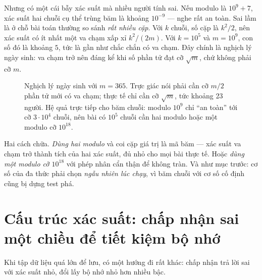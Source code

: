 \documentclass[../../algorithm.tex]{subfiles}
\begin{document}
Nhưng có một cái bẫy xác suất mà nhiều người tính sai. Nếu modulo là \(10^9+7\), xác suất hai chuỗi cụ thể trùng băm là khoảng \(10^{-9}\) --- nghe rất an toàn. Sai lầm là ở chỗ bài toán thường so sánh \emph{rất nhiều cặp}. Với \(k\) chuỗi, số cặp là \(k^2/2\), nên xác suất có ít nhất một va chạm xấp xỉ \(k^2/(2m)\). Với \(k = 10^5\) và \(m = 10^9\), con số đó là khoảng \(5\), tức là gần như chắc chắn có va chạm. Đây chính là nghịch lý ngày sinh: va chạm trở nên đáng kể khi số phần tử đạt cỡ \(\sqrt{m}\), chứ không phải cỡ \(m\).

\begin{figure}[H]\centering
{}
\caption{Nghịch lý ngày sinh với \(m = 365\). Trực giác nói phải cần cỡ \(m/2\) phần tử mới có va chạm; thực tế chỉ cần cỡ \(\sqrt{m}\), tức khoảng 23 người. Hệ quả trực tiếp cho băm chuỗi: modulo \(10^9\) chỉ ``an toàn'' tới cỡ \(3\cdot10^4\) chuỗi, nên bài có \(10^5\) chuỗi cần hai modulo hoặc một modulo cỡ \(10^{18}\).}
\label{fig:birthday}
\end{figure}

Hai cách chữa. \emph{Dùng hai modulo} và coi cặp giá trị là mã băm --- xác suất va chạm trở thành tích của hai xác suất, đủ nhỏ cho mọi bài thực tế. Hoặc \emph{dùng một modulo cỡ \(10^{18}\)} với phép nhân cẩn thận để không tràn. Và như mục trước: cơ số của đa thức phải chọn \emph{ngẫu nhiên lúc chạy}, vì băm chuỗi với cơ số cố định cũng bị dựng test phá.

\section{Cấu trúc xác suất: chấp nhận sai một chiều để tiết kiệm bộ nhớ}

Khi tập dữ liệu quá lớn để lưu, có một hướng đi rất khác: chấp nhận trả lời sai với xác suất nhỏ, đổi lấy bộ nhớ nhỏ hơn nhiều bậc.
\end{document}
